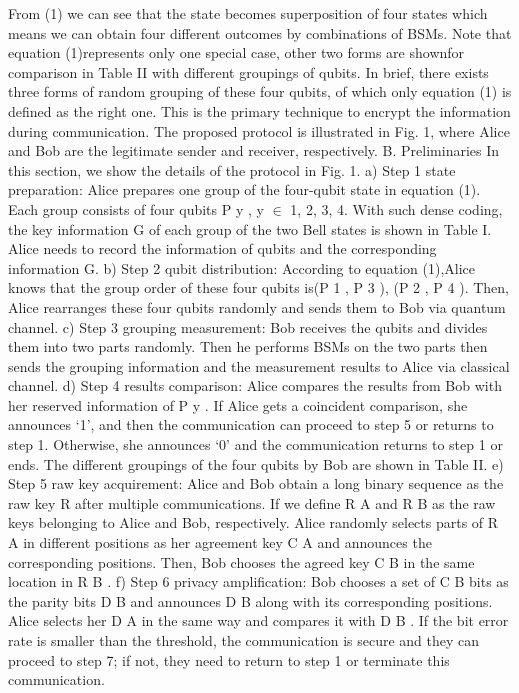 From (1) we can see that the state becomes superposition of four states which means we can obtain four different outcomes by combinations of BSMs. Note that equation (1)represents only one special case, other two forms are shownfor comparison in Table II with different groupings of qubits.
In brief, there exists three forms of random grouping of these four qubits, of which only equation (1) is defined as the right one. This is the primary technique to encrypt the information during communication. The proposed protocol is illustrated in Fig. 1, where Alice and Bob are the legitimate sender and receiver, respectively.
B. Preliminaries In this section, we show the details of the protocol in Fig. 1.
a) Step 1 state preparation: Alice prepares one group of the four-qubit state in equation (1). Each group consists of four qubits P y , y $\in$ {1, 2, 3, 4}. With such dense coding, the key information G of each group of the two Bell states is shown in Table I. Alice needs to record the information of qubits and the corresponding information G.
b) Step 2 qubit distribution: According to equation (1),Alice knows that the group order of these four qubits is{(P 1 , P 3 ), (P 2 , P 4 )}. Then, Alice rearranges these four qubits randomly and sends them to Bob via quantum channel.
c) Step 3 grouping measurement: Bob receives the qubits and divides them into two parts randomly. Then he performs BSMs on the two parts then sends the grouping information and the measurement results to Alice via classical channel.
d) Step 4 results comparison: Alice compares the results from Bob with her reserved information of P y . If Alice gets a coincident comparison, she announces ‘1’, and then the communication can proceed to step 5 or returns to step 1.
Otherwise, she announces ‘0’ and the communication returns to step 1 or ends. The different groupings of the four qubits by Bob are shown in Table II.
e) Step 5 raw key acquirement: Alice and Bob obtain a long binary sequence as the raw key R after multiple communications. If we define R A and R B as the raw keys belonging to Alice and Bob, respectively. Alice randomly selects parts of R A in different positions as her agreement key C A and announces the corresponding positions. Then, Bob chooses the agreed key C B in the same location in R B .
f) Step 6 privacy amplification: Bob chooses a set of C B bits as the parity bits D B and announces D B along with its corresponding positions. Alice selects her D A in the same way and compares it with D B . If the bit error rate is smaller than the threshold, the communication is secure and they can proceed to step 7; if not, they need to return to step 1 or terminate this communication.
